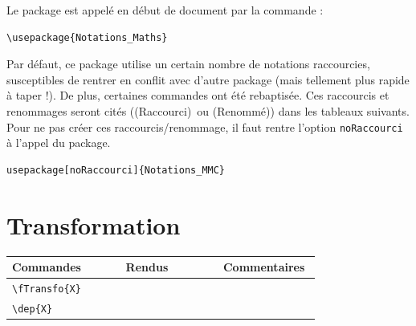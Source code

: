 \documentclass[a4paper,10pt]{article}
\newcommand{\rac}{({\color{red}Raccourci})}
\newcommand{\ren}{({\color{blue}Renommé})}
\begin{document}
	Le package est appelé en début de document par la commande :
	\begin{verbatim}
\usepackage{Notations_Maths}
	\end{verbatim}

	Par défaut, ce package utilise un certain nombre de notations raccourcies, susceptibles de rentrer en conflit avec d'autre package (mais tellement plus rapide à taper !).
	De plus, certaines commandes ont été rebaptisée.
	Ces raccourcis et renommages seront cités (\rac\ ou \ren) dans les tableaux suivants.
	Pour ne pas créer ces raccourcis/renommage, il faut rentre l'option \verb!noRaccourci! à l'appel du package.

	\begin{verbatim}
usepackage[noRaccourci]{Notations_MMC}
	\end{verbatim}
	
	
	
	\section{Transformation}
    \noindent
	\begin{tabular}{|p{0.35\linewidth}|p{0.3\linewidth}|p{0.3\linewidth}|}
		\hline
			\textbf{Commandes}&\textbf{Rendus}&\textbf{Commentaires}
		\\\hline\hline
			\verb!\fTransfo{X}!			&	\fTransfo{X}			&	
		\\\hline
			\verb!\dep{X}!			&	\dep{X}			&	
		\\\hline
	\end{tabular}
	
\end{document}
